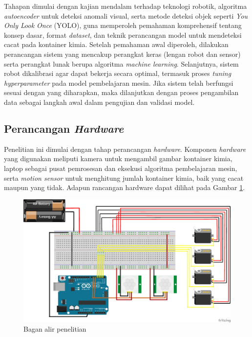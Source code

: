 Tahapan dimulai dengan kajian mendalam terhadap teknologi robotik,
algoritma \textit{autoencoder} untuk deteksi anomali visual, serta
metode deteksi objek seperti \textit{You Only Look Once} (YOLO), guna
memperoleh pemahaman komprehensif tentang konsep dasar, format
\textit{dataset}, dan teknik perancangan model untuk mendeteksi cacat
pada kontainer kimia. Setelah pemahaman awal diperoleh, dilakukan
perancangan sistem yang mencakup perangkat keras (lengan robot dan
sensor) serta perangkat lunak berupa algoritma \textit{machine
learning}. Selanjutnya, sistem robot dikalibrasi agar dapat bekerja
secara optimal, termasuk proses \textit{tuning hyperparameter} pada
model pembelajaran mesin. Jika sistem telah berfungsi sesuai dengan
yang diharapkan, maka dilanjutkan dengan proses pengambilan data
sebagai langkah awal dalam pengujian dan validasi model.

\vspace{1em}

\subsection{Perancangan \textit{Hardware}}
Penelitian ini dimulai dengan tahap perancangan \textit{hardware}. Komponen
\textit{hardware} yang digunakan meliputi kamera untuk mengambil gambar
kontainer kimia, laptop sebagai pusat pemrosesan dan eksekusi
algoritma pembelajaran mesin, serta \textit{motion sensor} untuk menghitung
jumlah kontainer kimia, baik yang cacat maupun yang tidak. Adapun
rancangan hardware dapat dilihat pada Gambar \ref{fig:rangkaian}.

\begin{figure}[H]
  \centering
  \includegraphics[width=\textwidth]{gambar/rangkaian.png}
  \caption{Bagan alir penelitian}
  \label{fig:rangkaian}
\end{figure}
\vspace{-1em}

